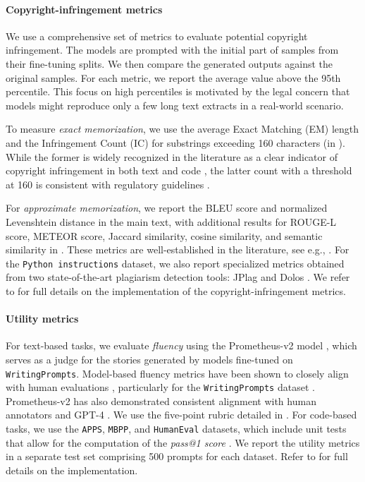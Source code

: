 \paragraph{Copyright-infringement metrics} We use a comprehensive set of metrics to evaluate potential copyright infringement. The models are prompted with the initial part of samples from their fine-tuning splits. We then compare the generated outputs against the original samples. For each metric, we report the average value above the 95th percentile. This focus on high percentiles is motivated by the legal concern that models might reproduce only a few long text extracts in a real-world scenario.




To measure \textit{exact memorization}, we use the average Exact Matching (EM) length and the Infringement Count (IC) for substrings exceeding 160 characters (in ). While the former is widely recognized in the literature as a clear indicator of copyright infringement in both text and code \citep{lee2021deduplicating, karamolegkou2023copyright, carlini2023quantifying, yu2023codeiipprompt}, the latter count with a threshold at 160 is consistent with regulatory guidelines \citep{mueller2024llms}.

For \textit{approximate memorization}, we report the BLEU score and normalized Levenshtein distance in the main text, with additional results for ROUGE-L score, METEOR score, Jaccard similarity, cosine similarity, and semantic similarity in . These metrics are well-established in the literature, see e.g., \citep{ippolito2023preventing, huang2023privacy, chen2024copybench}. For the \texttt{Python instructions} dataset, we also report specialized metrics obtained from two state-of-the-art plagiarism detection tools: JPlag \citep{prechelt2002finding} and Dolos \citep{maertens2022dolos}. We refer to  for full details on the implementation of the copyright-infringement metrics.


\paragraph{Utility metrics} For text-based tasks, we evaluate \textit{fluency} using the Prometheus-v2 model \citep{kim2024prometheus}, which serves as a judge for the stories generated by models fine-tuned on \texttt{WritingPrompts}. Model-based fluency metrics have been shown to closely align with human evaluations \citep{liu2023g, sottana2023evaluation}, particularly for the \texttt{WritingPrompts} dataset \citep{chiang2023can}. Prometheus-v2 has also demonstrated consistent alignment with human annotators and GPT-4 \citep{kim2024prometheus}. We use the five-point rubric detailed in . For code-based tasks, we use the \texttt{APPS}, \texttt{MBPP}, and \texttt{HumanEval} datasets, which include unit tests that allow for the computation of the \textit{pass@1 score} \citep{chen2021evaluating}. We report the utility metrics in a separate test set comprising 500 prompts for each dataset. Refer to  for full details on the implementation.




